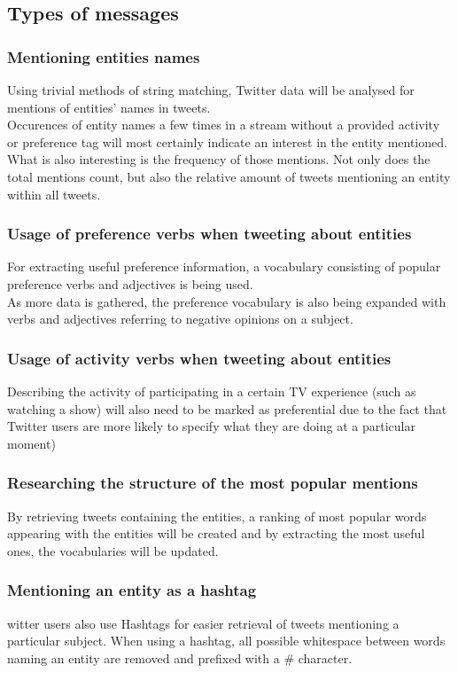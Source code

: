 \documentclass{article}
\begin{document}
\subsection{Types of messages}
\subsubsection{Mentioning entities names}
Using trivial methods of string matching, Twitter data will be analysed for
mentions of entities' names in tweets.
\\ Occurences of entity names a few times in a stream without a
provided activity or preference tag will most certainly indicate an interest in
the entity mentioned. 
\\What is also interesting is the frequency of those mentions. Not only does
the total mentions count, but also the relative amount of tweets mentioning an
entity within all tweets.
\subsubsection{Usage of preference verbs when tweeting about entities}
For extracting useful preference information, a vocabulary consisting of
popular preference verbs and adjectives is being used.
\\ As more data is gathered, the preference vocabulary is also being expanded 
with verbs and adjectives referring to negative opinions on a subject.
\subsubsection{Usage of activity verbs when tweeting about entities}
Describing the activity of participating in a certain TV experience (such
as watching a show) will also need to be marked as preferential due to the
fact that Twitter users are more likely to specify what they are doing at a
particular moment)
\subsubsection{Researching the structure of the most popular mentions}
By retrieving tweets containing the entities, a ranking of most popular words
appearing with the entities will be created and by extracting the most useful
ones, the vocabularies will be updated.
\subsubsection{Mentioning an entity as a hashtag}
witter users also use Hashtags for easier retrieval of tweets mentioning
a particular subject. When using a hashtag, all possible whitespace between
words naming an entity are removed and prefixed with a \# character.
\end{document}
